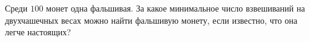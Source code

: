 Среди $100$ монет одна фальшивая. За какое минимальное число взвешиваний на двухчашечных весах можно найти фальшивую монету, если известно, что она легче настоящих?